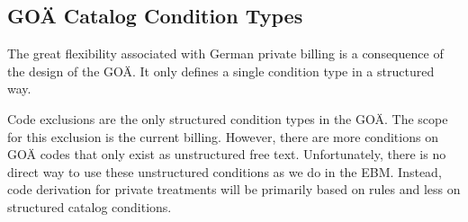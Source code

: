 \subsection{GOÄ Catalog Condition Types}\label{subsec:goa-condition-types}
The great flexibility associated with German private billing is a consequence of the design of the GOÄ.
It only defines a single condition type in a structured way.

Code exclusions are the only structured condition types in the GOÄ.
The scope for this exclusion is the current billing.
However, there are more conditions on GOÄ codes that only exist as unstructured free text.
Unfortunately, there is no direct way to use these unstructured conditions as we do in the EBM.
Instead, code derivation for private treatments will be primarily based on rules and less on structured catalog conditions.
